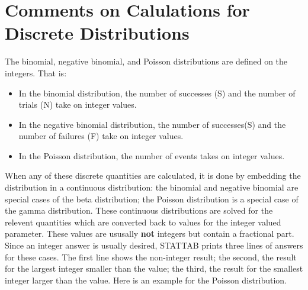\documentclass[12pt,dvips]{article}
\newcommand{\mysection}[1]
    {\color{blue} \section{#1} \color{black}}
\begin{document}
\mysection{Comments on Calulations for Discrete Distributions}

The binomial, negative binomial, and Poisson distributions are defined
on the integers.  That is:

\begin{itemize}

\item In the binomial distribution, the number of successes (S) and
the number of trials (N) take on integer values.

\item In the negative binomial distribution, the number of
  successes(S) and the number of failures (F) take on integer values.

\item In the Poisson distribution, the number of events takes on
integer values.

\end{itemize}

When any  of these discrete quantities  are calculated, it  is done by
embedding the distribution in  a continuous distribution: the binomial
and negative binomial are special  cases of the beta distribution; the
Poisson  distribution is  a special  case of  the gamma  distribution. 
These continuous distributions are  solved for the relevent quantities
which are converted  back to values for the  integer valued parameter. 
These values are ususally {\bf  not} integers but contain a fractional
part.   Since an  integer answer  is usually  desired,  STATTAB prints
three  lines of answers  for these  cases.  The  first line  shows the
non-integer  result; the second,  the result  for the  largest integer
smaller than the value; the third, the result for the smallest integer
larger  than  the   value.   Here  is  an  example   for  the  Poisson
distribution.
\end{document}
